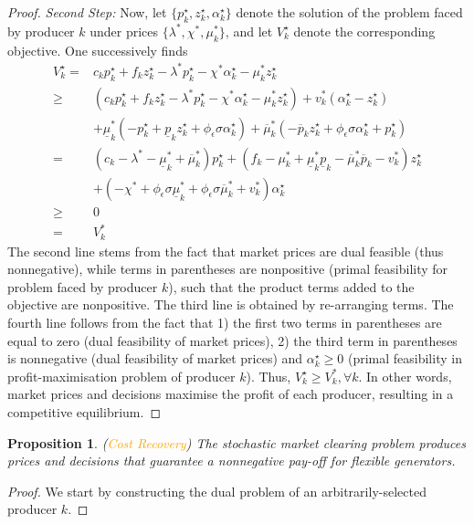 \documentclass{article}
\newtheorem{proposition}{Proposition}
\begin{document}
\begin{proof}
\textit{Second Step:} Now, let $\{p_k^\star, z_k^\star, \alpha_k^\star\}$ denote the solution of the problem faced by producer $k$ under prices $\{\lambda^*, \chi^*, \mu_k^*\}$, and let $V_k^\star$ denote the corresponding objective. One successively finds
\begin{align}
    V_k^\star =& c_k p_k^\star + f_k z_k^\star - \lambda^* p_k^\star - \chi^* \alpha_k^\star - \mu_k^*z_k^\star\\
    \ge& (c_k p_k^\star + f_k z_k^\star - \lambda^* p_k^\star - \chi^* \alpha_k^\star - \mu_k^*z_k^\star) + v_k^*(\alpha_k^\star - z_k^\star)\\
    &+ \underline{\mu}_k^*(-p_k^\star  + \underline{p}_k z_k^\star + \phi_{\epsilon} \sigma \alpha_k^\star) + \overline{\mu}_k^* (-\overline{p}_k z_k^\star + \phi_{\epsilon} \sigma \alpha_k^\star + p_k^\star)\\
    =& (c_k - \lambda^* - \underline{\mu}_k^* + \overline{\mu}_k^*) p_k^\star+(f_k - \mu_k^* + \underline{\mu}_k^* \underline{p}_k - \overline{\mu}_k^* \overline{p}_k - v_k^*) z_k^\star\\
    &+ (-\chi^* + \phi_{\epsilon} \sigma \underline{\mu}_k^* + \phi_{\epsilon} \sigma \overline{\mu}_k^* + v_k^*) \alpha_k^\star\\
    \ge& 0\\
    =& V_k^*
\end{align}
The second line stems from the fact that market prices are dual feasible (thus nonnegative), while terms in parentheses are nonpositive (primal feasibility for problem faced by producer $k$), such that the product terms added to the objective are nonpositive. The third line is obtained by re-arranging terms. The fourth line follows from the fact that 1) the first two terms in parentheses are equal to zero (dual feasibility of market prices), 2) the third term in parentheses is nonnegative (dual feasibility of market prices) and $\alpha_k^\star \ge 0$ (primal feasibility in profit-maximisation problem of producer $k$). Thus, $V_k^\star \ge V_k^*, \forall k$. In other words, market prices and decisions maximise the profit of each producer, resulting in a competitive equilibrium.
\end{proof}

\begin{proposition}
(\textcolor{orange}{Cost Recovery}) The stochastic market clearing problem produces prices and decisions that guarantee a nonnegative pay-off for flexible generators.
\end{proposition}
\begin{proof}
We start by constructing the dual problem of an arbitrarily-selected producer $k$.
\end{proof}
\end{document}
